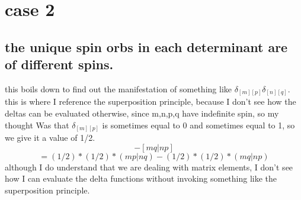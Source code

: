 \documentclass[12pt]{article}
\begin{document}
\section{case 2}
\subsection{the unique spin orbs in each determinant are of different spins.}

this boils down to find out the manifestation of something like $\delta _{[m][p]}\delta _{[n][q]}$. this is where I reference the superposition principle, because I don't see how the deltas can be evaluated otherwise, since m,n,p,q have indefinite spin, so my thought Was that $\delta _{[m][p]}$ is sometimes equal to 0 and sometimes equal to 1, so we give it a value of 1/2.
\begin{equation}
    [mp|nq]-[mq|np]
\end{equation}
\begin{equation}
    =(1/2)*(1/2)*(mp|nq)-(1/2)*(1/2)*(mq|np)
\end{equation}
although I do understand that we are dealing with matrix elements, I don't see how I can evaluate the delta functions without invoking something like the superposition principle.
\end{document}
